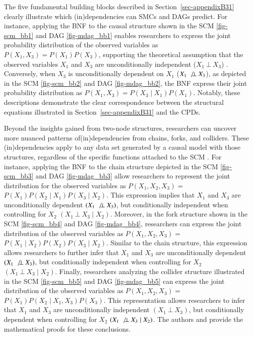 \documentclass[
  authoryear,
  review,
  1p]{elsarticle}
\begin{document}
The five fundamental building blocks described in
Section~\ref{sec-appendixB31} clearly illustrate which (in)dependencies
can SMCs and DAGs predict. For instance, applying the BNF to the causal
structure shown in the SCM \ref{fig-scm_bb1} and DAG \ref{fig-mdag_bb1}
enables researchers to express the joint probability distribution of the
observed variables as \(P(X_{1}, X_{3}) = P(X_{1}) P(X_{3})\),
supporting the theoretical assumption that the observed variables
\(X_{1}\) and \(X_{3}\) are unconditionally independent
(\(X_{1} \:\bot\:X_{3}\)) \citep[pp.~24]{Neal_2020}. Conversely, when
\(X_{3}\) is unconditionally dependent on \(X_{1}\)
(\(X_{1} \:\not\bot\:X_{3}\)), as depicted in the SCM \ref{fig-scm_bb2}
and DAG \ref{fig-mdag_bb2}, the BNF express their joint probability
distribution as \(P(X_{1}, X_{3}) = P(X_{3} \mid X_{1}) P(X_{1})\).
Notably, these descriptions demonstrate the clear correspondence between
the structural equations illustrated in Section~\ref{sec-appendixB31}
and the CPDs.

Beyond the insights gained from two-node structures, researchers can
uncover more nuanced patterns of(in)dependencies from chains, forks, and
colliders. These (in)dependencies apply to any data set generated by a
causal model with those structures, regardless of the specific functions
attached to the SCM \citep[pp.~36]{Pearl_et_al_2016}. For instance,
applying the BNF to the chain structure depicted in the SCM
\ref{fig-scm_bb3} and DAG \ref{fig-mdag_bb3} allow researchers to
represent the joint distribution for the observed variables as
\(P(X_{1},X_{2},X_{3}) =\)
\(P(X_{1}) P(X_{2} \mid X_{1}) P(X_{3} \mid X_{2})\). This expression
implies that \(X_{1}\) and \(X_{3}\) are unconditionally dependent
\((X_{1} \:\not\bot\:X_{3})\), but conditionally independent when
controlling for \(X_{2}\) \((X_{1} \:\bot\:X_{3} \mid X_{2})\).
Moreover, in the fork structure shown in the SCM \ref{fig-scm_bb4} and
DAG \ref{fig-mdag_bb4}, researchers can express the joint distribution
of the observed variables as \(P(X_{1},X_{2},X_{3}) =\)
\(P(X_{1} \mid X_{2}) P(X_{2}) P(X_{3} \mid X_{2})\). Similar to the
chain structure, this expression allows researchers to further infer
that \(X_{1}\) and \(X_{3}\) are unconditionally dependent
\((X_{1} \:\not\bot\:X_{3})\), but conditionally independent when
controlling for \(X_{2}\) \((X_{1} \:\bot\:X_{3} \mid X_{2})\). Finally,
researchers analyzing the collider structure illustrated in the SCM
\ref{fig-scm_bb5} and DAG \ref{fig-mdag_bb5} can express the joint
distribution of the observed variables as \(P(X_{1},X_{2},X_{3}) =\)
\(P(X_{1}) P(X_{2} \mid X_{1}, X_{3}) P(X_{3})\). This representation
allows researchers to infer that \(X_{1}\) and \(X_{3}\) are
unconditionally independent \((X_{1} \:\bot\:X_{3})\), but conditionally
dependent when controlling for \(X_{2}\)
\((X_{1} \:\not\bot\:X_{3} \mid X_{2})\). The authors \citet[pp.~37, 40,
41]{Pearl_et_al_2016} and \citet[pp.~25--26]{Neal_2020} provide the
mathematical proofs for these conclusions.
\end{document}
